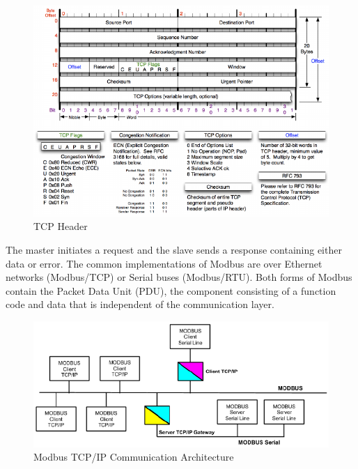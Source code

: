 \documentclass[11pt,]{article}
\begin{document}
\clearpage

\begin{figure}[top]

{\centering \includegraphics{thesis_files/figure-latex/unnamed-chunk-7-1} 

}

\caption{TCP Header}\label{fig:unnamed-chunk-7}
\end{figure}

The master initiates a request and the slave sends a response containing
either data or error. The common implementations of Modbus are over
Ethernet networks (Modbus/TCP) or Serial buses (Modbus/RTU). Both forms
of Modbus contain the Packet Data Unit (PDU), the component consisting
of a function code and data that is independent of the communication
layer.

\begin{figure}[bottom]

{\centering \includegraphics{thesis_files/figure-latex/unnamed-chunk-8-1} 

}

\caption{Modbus TCP/IP Communication Architecture}\label{fig:unnamed-chunk-8}
\end{figure}
\end{document}
